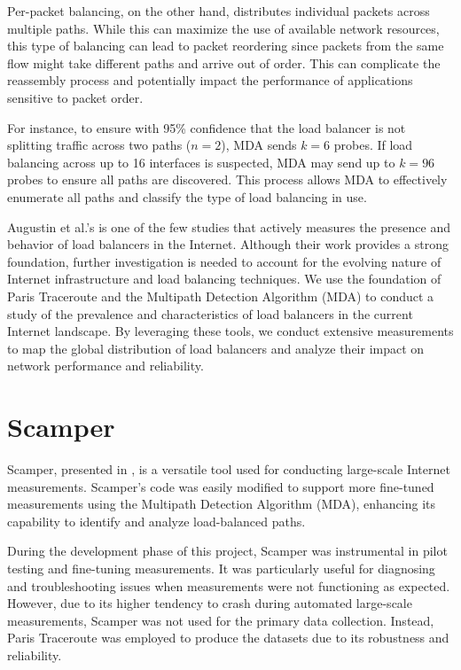 \documentclass[12pt]{cwru_thesis}
\begin{document}
Per-packet balancing, on the other hand, distributes individual packets across multiple paths. While this can maximize the use of available network resources, this type of balancing can lead to packet reordering since packets from the same flow might take different paths and arrive out of order. This can complicate the reassembly process and potentially impact the performance of applications sensitive to packet order.

For instance, to ensure with 95\% confidence that the load balancer is not splitting traffic across two paths (\(n = 2\)), MDA sends \(k = 6\) probes. If load balancing across up to 16 interfaces is suspected, MDA may send up to \(k = 96\) probes to ensure all paths are discovered. This process allows MDA to effectively enumerate all paths and classify the type of load balancing in use.


Augustin et al.'s \cite{augustin2010measuring} is one of the few studies that actively measures the presence and behavior of load balancers in the Internet. Although their work provides a strong foundation, further investigation is needed to account for the evolving nature of Internet infrastructure and load balancing techniques. We use the foundation of Paris Traceroute and the Multipath Detection Algorithm (MDA) to conduct a study of the prevalence and characteristics of load balancers in the current Internet landscape. By leveraging these tools, we conduct extensive measurements to map the global distribution of load balancers and analyze their impact on network performance and reliability.



\section{Scamper}

Scamper, presented in \cite{luckie2010scamper}, is a versatile tool used for conducting large-scale Internet measurements. Scamper's code was easily modified to support more fine-tuned measurements using the Multipath Detection Algorithm (MDA), enhancing its capability to identify and analyze load-balanced paths. 

During the development phase of this project, Scamper was instrumental in pilot testing and fine-tuning measurements. It was particularly useful for diagnosing and troubleshooting issues when measurements were not functioning as expected. However, due to its higher tendency to crash during automated large-scale measurements, Scamper was not used for the primary data collection. Instead, Paris Traceroute was employed to produce the datasets due to its robustness and reliability.
\end{document}
